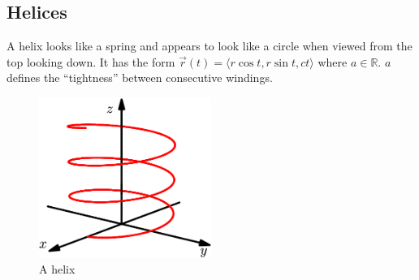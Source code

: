\subsection{Helices}
\noindent
A helix looks like a spring and appears to look like a circle when viewed from the top looking down.
It has the form $\vec{r}(t) = \langle r\cos{t}, r\sin{t}, ct\rangle$ where $a\in\mathbb{R}$. $a$ defines the ``tightness'' between consecutive windings.

\begin{figure}[H]
	\centering
	\includegraphics[width=0.5\textwidth]{./Images/vectorValuedFunctions/Helix.png}
	\caption{A helix}
\end{figure}